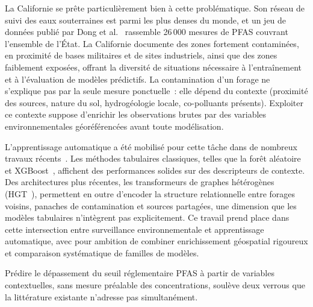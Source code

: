 La Californie se pr\^ete particuli\`erement bien \`a cette probl\'ematique. Son r\'eseau de suivi des eaux souterraines est parmi les plus denses du monde, et un jeu de donn\'ees publi\'e par Dong et al.~\cite{dong2024pfas} rassemble 26\,000 mesures de PFAS couvrant l'ensemble de l'\'Etat. La Californie documente des zones fortement contamin\'ees, en proximit\'e de bases militaires et de sites industriels, ainsi que des zones faiblement expos\'ees, offrant la diversit\'e de situations n\'ecessaire \`a l'entra\^inement et \`a l'\'evaluation de mod\`eles pr\'edictifs. La contamination d'un forage ne s'explique pas par la seule mesure ponctuelle~: elle d\'epend du contexte (proximit\'e des sources, nature du sol, hydrog\'eologie locale, co-polluants pr\'esents). Exploiter ce contexte suppose d'enrichir les observations brutes par des variables environnementales g\'eor\'ef\'erenc\'ees avant toute mod\'elisation.

L'apprentissage automatique a \'et\'e mobilis\'e pour cette t\^ache dans de nombreux travaux r\'ecents~\cite{bomgni2025pfas}. Les m\'ethodes tabulaires classiques, telles que la for\^et al\'eatoire~\cite{breiman2001rf} et XGBoost~\cite{chen2016xgboost}, affichent des performances solides sur des descripteurs de contexte. Des architectures plus r\'ecentes, les transformeurs de graphes h\'et\'erog\`enes (HGT~\cite{hu2020hgt}), permettent en outre d'encoder la structure relationnelle entre forages voisins, panaches de contamination et sources partag\'ees, une dimension que les mod\`eles tabulaires n'int\`egrent pas explicitement. Ce travail prend place dans cette intersection entre surveillance environnementale et apprentissage automatique, avec pour ambition de combiner enrichissement g\'eospatial rigoureux et comparaison syst\'ematique de familles de mod\`eles.


\label{sec:intro-problematique}

Pr\'edire le d\'epassement du seuil r\'eglementaire PFAS \`a partir de variables contextuelles, sans mesure pr\'ealable des concentrations, soul\`eve deux verrous que la litt\'erature existante n'adresse pas simultan\'ement.

